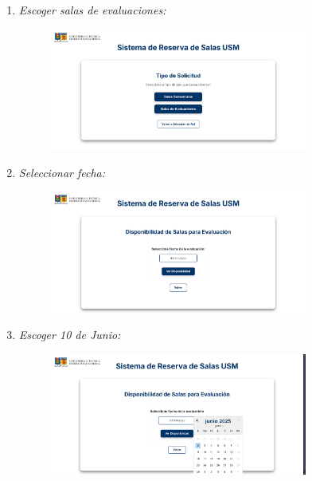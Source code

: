 \documentclass{article}
\begin{document}
\begin{enumerate}
\begin{enumerate}
            \item \textit{Escoger salas de evaluaciones:}
            \begin{figure}[H] 
                \centering 
                \includegraphics[width=0.8\textwidth]{IMG/ss9.png} 
            \end{figure}

            \newpage
            \item \textit{Seleccionar fecha:}
            \begin{figure}[H] 
                \centering 
                \includegraphics[width=0.8\textwidth]{IMG/ss15.png} 
            \end{figure}

            
            \item \textit{Escoger 10 de Junio:}
            \begin{figure}[H] 
                \centering 
                \includegraphics[width=0.8\textwidth]{IMG/ss16.png} 
            \end{figure}


\end{enumerate}
\end{enumerate}
\end{document}
